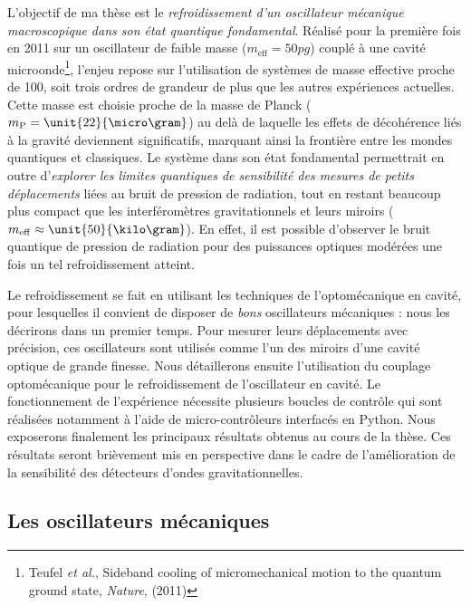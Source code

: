 \documentclass[12pt,a4paper]{article}
\begin{document}
L'objectif de ma thèse est le \textit{refroidissement d'un oscillateur mécanique macroscopique dans son état quantique fondamental}.
Réalisé pour la première fois en 2011 sur un oscillateur de faible masse ($m_\mathrm{eff} = \unit{50}{pg}$) couplé à une cavité microonde\footnote{Teufel \textit{et al.}, Sideband cooling of micromechanical motion to the quantum ground state, \textit{Nature}, (2011)}, l'enjeu repose sur l'utilisation de systèmes de masse effective proche de \unit{100}{\micro\gram}, soit trois ordres de grandeur de plus que les autres expériences actuelles.
Cette masse est choisie proche de la masse de Planck ($m_\mathrm{P}=\unit{22}{\micro\gram}$) au delà de laquelle les effets de décohérence liés à la gravité deviennent significatifs, marquant ainsi la frontière entre les \og mondes \fg{} quantiques et classiques. 
Le système dans son état fondamental permettrait en outre d'\textit{explorer les limites quantiques de sensibilité des mesures de petits déplacements} liées au bruit de pression de radiation, tout en restant beaucoup plus compact que les interféromètres gravitationnels et leurs miroirs ($m_\mathrm{eff}\approx\unit{50}{\kilo\gram}$).
En effet, il est possible d'observer le bruit quantique de pression de radiation pour des puissances optiques modérées une fois un tel refroidissement atteint.

Le refroidissement se fait en utilisant les techniques de l'optomécanique en cavité, pour lesquelles il convient de disposer de \textit{bons} oscillateurs mécaniques : nous les décrirons dans un premier temps.
Pour mesurer leurs déplacements avec précision, ces oscillateurs sont utilisés comme l'un des miroirs d'une cavité optique de grande finesse.
Nous détaillerons ensuite l'utilisation du couplage optomécanique pour le refroidissement de l'oscillateur en cavité.
Le fonctionnement de l'expérience nécessite plusieurs boucles de contrôle qui sont réalisées notamment à l'aide de micro-contrôleurs interfacés en Python.
Nous exposerons finalement les principaux résultats obtenus au cours de la thèse.
Ces résultats seront brièvement mis en perspective dans le cadre de l'amélioration de la sensibilité des détecteurs d'ondes gravitationnelles.

\subsection{Les oscillateurs mécaniques}
\label{sec:mechanical_oscillators}
\end{document}
